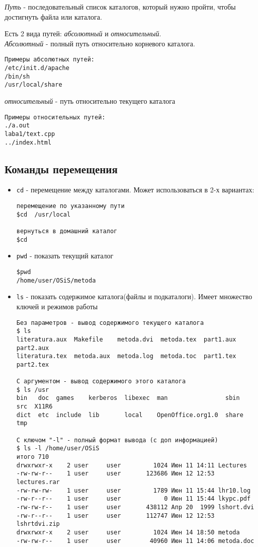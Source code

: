 \emph{Путь} - последовательный список каталогов, который нужно пройти, чтобы достигнуть файла или каталога.

Есть 2 вида путей: \emph{абсолютный} и \emph{относительный}.\\
\emph{Абсолютный}\label{fullpath} - полный путь относительно корневого каталога.
\begin{verbatim}
Примеры абсолютных путей:
/etc/init.d/apache
/bin/sh
/usr/local/share
\end{verbatim}
\emph{относительный} - путь относительно текущего каталога \label{relativepath}
\begin{verbatim}
Примеры относительных путей:
./a.out
laba1/text.cpp
../index.html
\end{verbatim}

\subsection{Команды перемещения}

\begin{itemize}
\item \verb+cd+ - перемещение между каталогами. Может использоваться в 2-х вариантах:
\begin{verbatim}
перемещение по указанному пути
$cd  /usr/local 

вернуться в домашний каталог
$cd
\end{verbatim} 

\item \verb+pwd+ - показать текущий каталог
\begin{verbatim}
$pwd 
/home/user/OSiS/metoda
\end{verbatim} 

\item \verb+ls+ - показать содержимое каталога(файлы и подкаталоги). Имеет множество ключей и режимов работы
\begin{verbatim}
Без параметров - вывод содержимого текущего каталога
$ ls
literatura.aux  Makefile    metoda.dvi  metoda.tex  part1.aux  part2.aux
literatura.tex  metoda.aux  metoda.log  metoda.toc  part1.tex  part2.tex

C аргументом - вывод содержимого этого каталога
$ ls /usr
bin   doc  games    kerberos  libexec  man                sbin   src  X11R6
dict  etc  include  lib       local    OpenOffice.org1.0  share  tmp

С ключом "-l" - полный формат вывода (с доп информацией)
$ ls -l /home/user/OSiS
итого 710
drwxrwxr-x    2 user     user         1024 Июн 11 14:11 Lectures
-rw-rw-r--    1 user     user       123686 Июн 12 12:53 lectures.rar
-rw-rw-rw-    1 user     user         1789 Июн 11 15:44 lhr10.log
-rw-r--r--    1 user     user            0 Июн 11 15:44 lkypc.pdf
-rw-rw-r--    1 user     user       438112 Апр 20  1999 lshort.dvi
-rw-r--r--    1 user     user       112747 Июн 12 12:53 lshrtdvi.zip
drwxrwxr-x    2 user     user         1024 Июн 14 18:50 metoda
-rw-rw-r--    1 user     user        40960 Июн 11 14:06 metoda.doc
\end{verbatim} 

\end{itemize}

